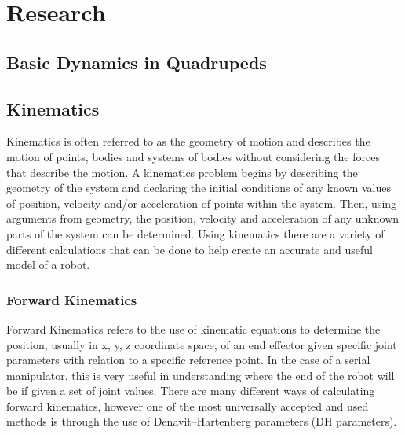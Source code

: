 \graphicspath{ {./figures/} }
\section{Research}
\subsection{Basic Dynamics in Quadrupeds}
\subsection{Kinematics}
 Kinematics is  often referred to as the geometry of motion and describes the motion of points, bodies and systems of bodies without considering the forces that describe the motion. A kinematics problem begins by describing the geometry of the system and declaring the initial conditions of any known values of position, velocity and/or acceleration of points within the system. Then, using arguments from geometry, the position, velocity and acceleration of any unknown parts of the system can be determined. Using kinematics there are a variety of different calculations that can be done to help create an accurate and useful model of a robot. 
    \subsubsection{Forward Kinematics}
    Forward Kinematics refers to the use of kinematic equations to determine the position, usually in x, y, z coordinate space, of an end effector given specific joint parameters with relation to a specific reference point. In the case of a serial manipulator, this is very useful in understanding where the end of the robot will be if given a set of joint values. There are many different ways of calculating forward kinematics, however one of the most universally accepted and used methods is through the use of Denavit–Hartenberg parameters (DH parameters).
